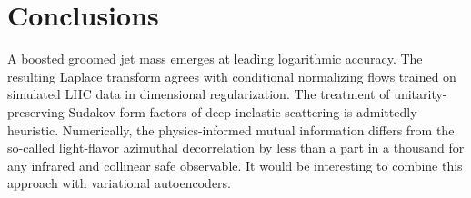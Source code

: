 \section{Conclusions}\label{sec:conclusions}

A boosted groomed jet mass emerges at leading logarithmic accuracy. The
resulting Laplace transform agrees with conditional normalizing flows
trained on simulated LHC data in dimensional regularization. The
treatment of unitarity-preserving Sudakov form factors of deep inelastic
scattering is admittedly heuristic. Numerically, the physics-informed
mutual information differs from the so-called light-flavor azimuthal
decorrelation by less than a part in a thousand for any infrared and
collinear safe observable. It would be interesting to combine this
approach with variational autoencoders.

